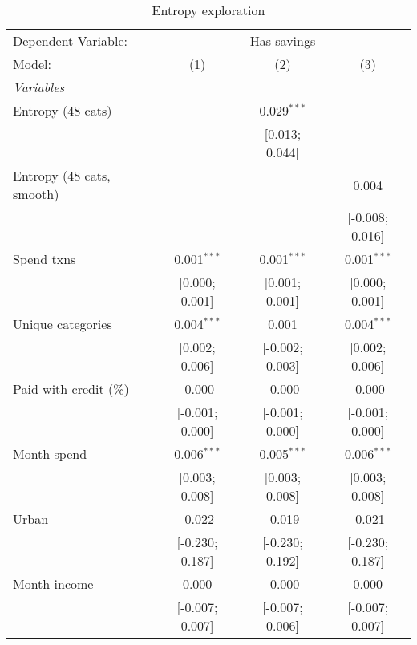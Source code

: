 
\begin{table}[htbp]
   \centering
   \tiny
   \begin{threeparttable}[b]
      \caption{\label{tab:reg_has_sa_inflows_explore} Entropy exploration}
      \begin{tabular}{lccc}
         \tabularnewline \midrule \midrule
         Dependent Variable: & \multicolumn{3}{c}{Has savings}\\
         Model:                    & (1)             & (2)             & (3)\\  
         \midrule
         \emph{Variables}\\
         Entropy (48 cats)         &                 & 0.029$^{***}$   &   \\   
                                   &                 & [0.013; 0.044]  &   \\   
         Entropy (48 cats, smooth) &                 &                 & 0.004\\   
                                   &                 &                 & [-0.008; 0.016]\\   
         Spend txns                & 0.001$^{***}$   & 0.001$^{***}$   & 0.001$^{***}$\\   
                                   & [0.000; 0.001]  & [0.001; 0.001]  & [0.000; 0.001]\\   
         Unique categories         & 0.004$^{***}$   & 0.001           & 0.004$^{***}$\\   
                                   & [0.002; 0.006]  & [-0.002; 0.003] & [0.002; 0.006]\\   
         Paid with credit (\%)     & -0.000          & -0.000          & -0.000\\   
                                   & [-0.001; 0.000] & [-0.001; 0.000] & [-0.001; 0.000]\\   
         Month spend               & 0.006$^{***}$   & 0.005$^{***}$   & 0.006$^{***}$\\   
                                   & [0.003; 0.008]  & [0.003; 0.008]  & [0.003; 0.008]\\   
         Urban                     & -0.022          & -0.019          & -0.021\\   
                                   & [-0.230; 0.187] & [-0.230; 0.192] & [-0.230; 0.187]\\   
         Month income              & 0.000           & -0.000          & 0.000\\   
                                   & [-0.007; 0.007] & [-0.007; 0.006] & [-0.007; 0.007]\\   

\end{tabular}
\end{threeparttable}
\end{table}
